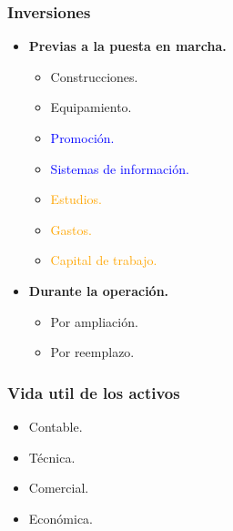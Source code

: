 \documentclass{templateNote}
\begin{document}
\subsubsection*{Inversiones}
\vspace{0.5cm}
\begin{minipage}[H]{0.45\textwidth}
    \begin{itemize}
        \item \textbf{Previas a la puesta en marcha.}
        \begin{itemize}
            \item Construcciones.
            \item Equipamiento.
            \item \textcolor{blue}{Promoción.}
            \item \textcolor{blue}{Sistemas de información.}
            \item \textcolor{orange}{Estudios.}
            \item \textcolor{orange}{Gastos.}
            \item \textcolor{orange}{Capital de trabajo.}
        \end{itemize}
    \end{itemize}
\end{minipage}
\hfill
\begin{minipage}[H]{0.45\textwidth}
    \begin{itemize}
        \item \textbf{Durante la operación.}
        \begin{itemize}
            \item Por ampliación.
            \item Por reemplazo.
        \end{itemize}
    \end{itemize}
\end{minipage}

\subsubsection*{Vida util de los activos}
\vspace{0.5cm}
\begin{center}
    \begin{minipage}[H]{0.5\textwidth}
        \begin{itemize}
            \item Contable.
            \item Técnica.
            \item Comercial.
            \item Económica.
        \end{itemize}
    \end{minipage}
\end{center}
\end{document}
